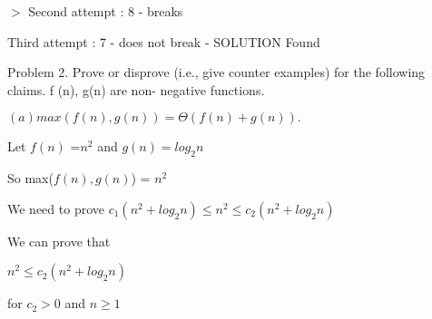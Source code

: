 \documentclass[letterpaper,portrait,12pt]{article}
\begin{document}
\begin{flushleft}
 $>$ Second attempt : 8 - breaks
\end{flushleft}


\begin{flushleft}
	Third attempt : 7 - does not break - SOLUTION Found
\end{flushleft}


\begin{flushleft}

\end{flushleft}


\begin{flushleft}
Problem 2. Prove or disprove (i.e., give counter examples) for the following claims. f (n), g(n) are non- negative functions.
\end{flushleft}


\begin{flushleft}

\end{flushleft}


\begin{flushleft}
$(a) max(f (n), g(n)) = \Theta(f (n) + g(n)).$
\end{flushleft}


\begin{flushleft}
 
\end{flushleft}


\begin{flushleft}
Let $f(n)$ =$n^2$ and $g(n)=log _2n$
\end{flushleft}


\begin{flushleft}
So max($f (n), g(n)$) = $n^2$
\end{flushleft}


\begin{flushleft}
We need to prove $c_1(n^2+log_2n) \le n^2 \le c_2(n^2+log_2n)$
\end{flushleft}


\begin{flushleft}
We can prove that 
\end{flushleft}


\begin{flushleft}
$n^2 \le c_2(n^2+log_2n)$
\end{flushleft}


\begin{flushleft}
for $c_2\gt0$ and $n \ge 1$
\end{flushleft}
\end{document}
